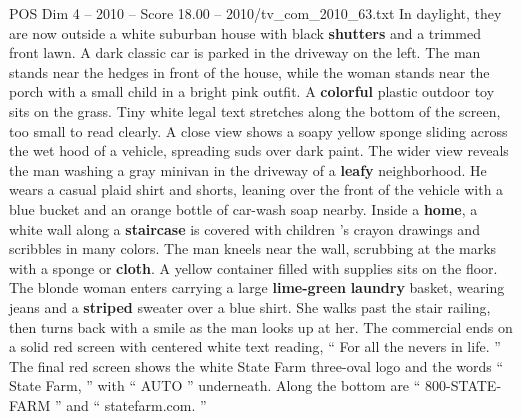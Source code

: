 \begin{textsample}{POS Dim 4 – 2010 – Score 18.00 – 2010/tv\_com\_2010\_63.txt}
In daylight, they are now outside a white suburban house with black \textbf{shutters} and a trimmed front lawn.
A dark classic car is parked in the driveway on the left.
The man stands near the hedges in front of the house, while the woman stands near the porch with a small child in a bright pink outfit.
A \textbf{colorful} plastic outdoor toy sits on the grass.
Tiny white legal text stretches along the bottom of the screen, too small to read clearly.
A close view shows a soapy yellow sponge sliding across the wet hood of a vehicle, spreading suds over dark paint.
The wider view reveals the man washing a gray minivan in the driveway of a \textbf{leafy} neighborhood.
He wears a casual plaid shirt and shorts, leaning over the front of the vehicle with a blue bucket and an orange bottle of car-wash soap nearby.
Inside a \textbf{home}, a white wall along a \textbf{staircase} is covered with children ’s crayon drawings and scribbles in many colors.
The man kneels near the wall, scrubbing at the marks with a sponge or \textbf{cloth}.
A yellow container filled with supplies sits on the floor.
The blonde woman enters carrying a large \textbf{lime-green} \textbf{laundry} basket, wearing jeans and a \textbf{striped} sweater over a blue shirt.
She walks past the stair railing, then turns back with a smile as the man looks up at her.
The commercial ends on a solid red screen with centered white text reading, “ For all the nevers in life. ” The final red screen shows the white State Farm three-oval logo and the words “ State Farm, ” with “ AUTO ” underneath.
Along the bottom are “ 800-STATE-FARM ” and “ statefarm.com. ”

\end{textsample}
